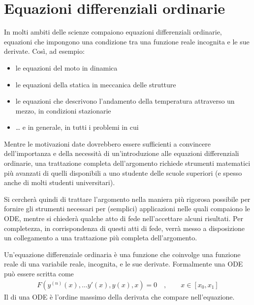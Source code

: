 \documentclass[letterpaper,10pt,english]{jupyterBook}
\begin{document}
\section{Equazioni differenziali ordinarie}
\label{\detokenize{ch/ode:equazioni-differenziali-ordinarie}}\label{\detokenize{ch/ode:ode-high-school}}\label{\detokenize{ch/ode::doc}}
\sphinxAtStartPar
{} In molti ambiti delle scienze compaiono equazioni differenziali ordinarie, equazioni che impongono una condizione tra una funzione reale incognita e le sue derivate. Così, ad esempio:
\begin{itemize}
\item {} 
\sphinxAtStartPar
le equazioni del moto in dinamica

\item {} 
\sphinxAtStartPar
le equazioni della statica in meccanica delle strutture

\item {} 
\sphinxAtStartPar
le equazioni che descrivono l’andamento della temperatura attraverso un mezzo, in condizioni stazionarie

\item {} 
\sphinxAtStartPar
…
e in generale, in tutti i problemi in cui 

\end{itemize}

\sphinxAtStartPar
{}
Mentre le motivazioni date dovrebbero essere sufficienti a convincere dell’importanza e della necessità di un’introduzione alle equazioni differenziali ordinarie, una trattazione completa dell’argomento richiede strumenti matematici più avanzati di quelli disponibili a uno studente delle scuole superiori (e spesso anche di molti studenti universitari).

\sphinxAtStartPar
Si cercherà quindi di trattare l’argomento nella maniera più rigorosa possibile per fornire gli strumenti necessari per (semplici) applicazioni nelle quali compaiono le ODE, mentre si chiederà qualche atto di fede nell’accettare alcuni risultati. Per completezza, in corrispondenza di questi atti di fede, verrà messo a disposizione un collegamento a una trattazione più completa dell’argomento.

\sphinxAtStartPar
{}
Un’equazione differenziale ordinaria è una funzione che coinvolge una funzione reale di una variabile reale, incognita, e le sue derivate. Formalmente una ODE può essere scritta come
\begin{equation*}
\begin{split}F(y^{(n)}(x), \dots y'(x), y(x), x) = 0 \quad , \qquad x \in [x_0, x_1]\end{split}
\end{equation*}
\sphinxAtStartPar
Il  di una ODE è l’ordine massimo della derivata che compare nell’equazione.
\end{document}

